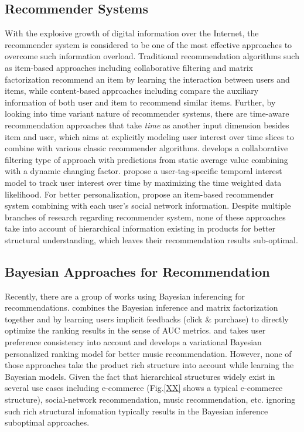 \subsection{Recommender Systems}

With the explosive growth of digital information over the Internet, the recommender system is considered to be one of the most effective approaches to overcome such information overload. Traditional recommendation algorithms such as item-based approaches including collaborative filtering \cite{Sarwar:2001:ICF:371920.372071,Su:2009:SCF:1592474.1722966} and matrix factorization \cite{Rendle:2010:FPM} recommend an item by learning the interaction between users and items, while content-based approaches including \cite{2011rsh..book...73L,Liu:2011,Yuan:2015} compare the auxiliary information of both user and item to recommend similar items.  Further, by looking into time variant nature of recommender systems, there are time-aware recommendation approaches \cite{Gultekin_acollaborative,Tang_review:2013} that take \emph{time} as another input dimension besides item and user, which aims at explicitly modeling user interest over time slices to combine with various classic recommender algorithms. \cite{Koren:2010} develops a collaborative filtering type of approach with predictions from static average value combining with a dynamic changing factor.  \cite{Yin:2011} propose a user-tag-specific temporal interest model to track user interest over time by maximizing the time weighted data likelihood.  For better personalization, \cite{Guy:2009} propose an item-based recommender system combining with each user's social network information. Despite multiple branches of research regarding recommender system, none of these approaches take into account of hierarchical information existing in products for better structural understanding, which leaves their recommendation results sub-optimal.  

\subsection{Bayesian Approaches for Recommendation}

Recently, there are a group of works using Bayesian inferencing for recommendations. \cite{rendle2009bpr} combines the Bayesian inference and matrix factorization together and by learning users implicit feedbacks (click \& purchase) to directly optimize the ranking results in the sense of AUC metrics. \cite{Ben-Elazar:2017} and \cite{zhang2007efficient} takes user preference consistency into account and develops a variational Bayesian personalized ranking model for better music recommendation.  However, none of those approaches take the product rich structure into account while learning the Bayesian models.  Given the fact that hierarchical structures widely exist in several use cases including e-commerce (Fig.\ref{XX} shows a typical e-commerce structure), social-network recommendation, music recommendation, etc. ignoring such rich structural infomation typically results in the Bayesian inference suboptimal approaches.  


